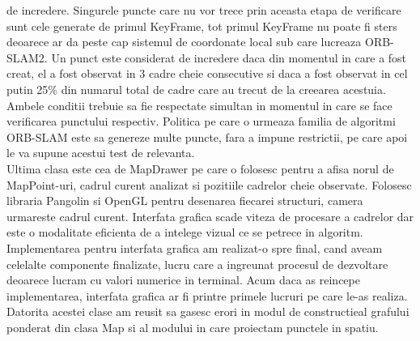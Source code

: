 \documentclass[12pt,a4paper]{report}
\begin{document}
de incredere. Singurele puncte care nu vor trece prin aceasta etapa de verificare sunt
cele generate de primul KeyFrame, tot primul KeyFrame nu poate fi sters deoarece 
ar da peste cap sistemul de coordonate local sub care lucreaza ORB-SLAM2. Un punct 
este considerat de incredere daca din momentul in care a fost creat, el a fost 
observat in 3 cadre cheie consecutive si daca a fost observat in cel putin 25\% din 
numarul total de cadre care au trecut de la creearea acestuia. Ambele conditii 
trebuie sa fie respectate simultan in momentul in care se face verificarea punctului
respectiv. Politica pe care o urmeaza familia de algoritmi ORB-SLAM este sa genereze 
multe puncte, fara a impune restrictii, pe care apoi le va supune acestui test de 
relevanta. \\

Ultima clasa este cea de MapDrawer pe care o folosesc pentru a afisa norul de MapPoint-uri,
cadrul curent analizat si pozitiile cadrelor cheie observate. Folosesc libraria Pangolin si 
OpenGL pentru desenarea fiecarei structuri, camera urmareste cadrul curent. Interfata grafica 
scade viteza de procesare a cadrelor dar este o modalitate eficienta de a intelege vizual ce 
se petrece in algoritm. Implementarea pentru interfata grafica am realizat-o spre final, cand 
aveam celelalte componente finalizate, lucru care a ingreunat procesul de dezvoltare deoarece 
lucram cu valori numerice in terminal. Acum daca as reincepe implementarea, interfata grafica ar fi
printre primele lucruri pe care le-as realiza. Datorita acestei clase am reusit sa gasesc erori in
modul de constructieal grafului ponderat din clasa Map si al modului in care proiectam punctele 
in spatiu. 
\end{document}

